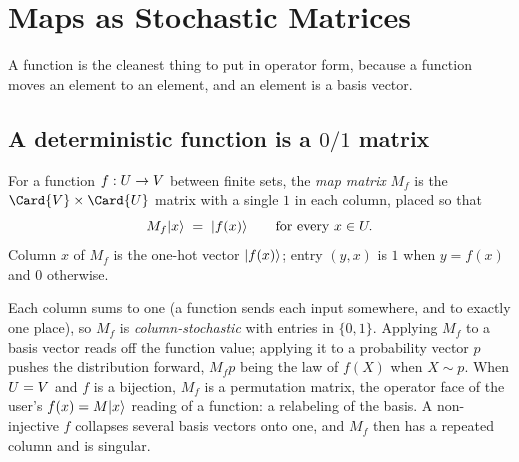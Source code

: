 %

\section{Maps as Stochastic Matrices}
\label{sec:operator-maps-stochastic}

A function is the cleanest thing to put in operator form, because a function
moves an element to an element, and an element is a basis vector.

\subsection*{A deterministic function is a $0/1$ matrix}

\begin{definition}
\label{def:operator-map-matrix}
For a function $f : U \to V$ between finite sets, the \emph{map matrix}
$M_f$ is the $\Card{V} \times \Card{\Universe}$ matrix with a single $1$ in each
column, placed so that
\[
  M_f \lvert x \rangle \;=\; \lvert f(x) \rangle
  \qquad \text{for every } x \in U.
\]
Column $x$ of $M_f$ is the one-hot vector $\lvert f(x) \rangle$; entry $(y, x)$ is $1$
when $y = f(x)$ and $0$ otherwise.
\end{definition}

Each column sums to one (a function sends each input somewhere, and to exactly
one place), so $M_f$ is \emph{column-stochastic} with entries in $\{0, 1\}$.
Applying $M_f$ to a basis vector reads off the function value; applying it to a
probability vector $p$ pushes the distribution forward, $M_f p$ being the law of
$f(X)$ when $X \sim p$. When $U = V$ and $f$ is a bijection, $M_f$ is a
permutation matrix, the operator face of the user's $f(x) = M\lvert x \rangle$ reading of
a function: a relabeling of the basis. A non-injective $f$ collapses several
basis vectors onto one, and $M_f$ then has a repeated column and is singular.

